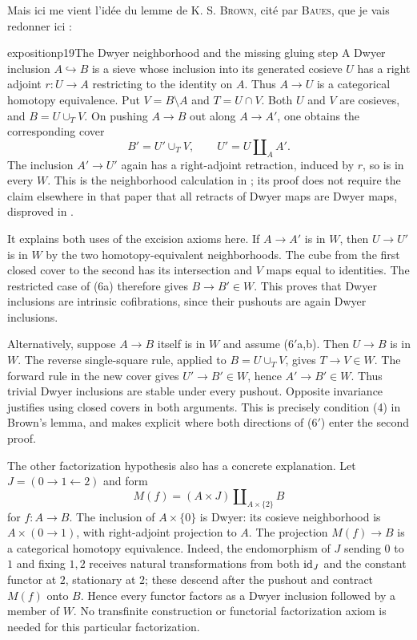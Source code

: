 Mais ici me vient l'idée du lemme de K. S. \textsc{Brown}, cité par \textsc{Baues}, que je vais redonner ici :

\begin{dcomment}{exposition}{p19}{The Dwyer neighborhood and the missing gluing step}
A Dwyer inclusion $A\hookrightarrow B$ is a sieve whose inclusion into its generated cosieve $U$ has a right adjoint $r:U\to A$ restricting to the identity on $A$. Thus $A\to U$ is a categorical homotopy equivalence. Put $V=B\setminus A$ and $T=U\cap V$. Both $U$ and $V$ are cosieves, and $B=U\cup_T V$. On pushing $A\to B$ out along $A\to A'$, one obtains the corresponding cover
\[
B'=U'\cup_T V,\qquad U'=U\amalg_A A'.
\]
The inclusion $A'\to U'$ again has a right-adjoint retraction, induced by $r$, so is in every $W$. This is the neighborhood calculation in \citet[Definition 4.1 and Proposition 4.3, pp.~313--317]{Thomason1980}; its proof does not require the claim elsewhere in that paper that all retracts of Dwyer maps are Dwyer maps, disproved in \citet{Cisinski1999Dwyer}.

It explains both uses of the excision axioms here. If $A\to A'$ is in $W$, then $U\to U'$ is in $W$ by the two homotopy-equivalent neighborhoods. The cube from the first closed cover to the second has its intersection and $V$ maps equal to identities. The restricted case of (6a) therefore gives $B\to B'\in W$. This proves that Dwyer inclusions are intrinsic cofibrations, since their pushouts are again Dwyer inclusions.

Alternatively, suppose $A\to B$ itself is in $W$ and assume (6$'$a,b). Then $U\to B$ is in $W$. The reverse single-square rule, applied to $B=U\cup_T V$, gives $T\to V\in W$. The forward rule in the new cover gives $U'\to B'\in W$, hence $A'\to B'\in W$. Thus trivial Dwyer inclusions are stable under every pushout. Opposite invariance justifies using closed covers in both arguments. This is precisely condition (4) in Brown's lemma, and makes explicit where both directions of (6$'$) enter the second proof.

The other factorization hypothesis also has a concrete explanation. Let $J=(0\to1\leftarrow2)$ and form
\[
M(f)=(A\times J)\amalg_{A\times\{2\}}B
\]
for $f:A\to B$. The inclusion of $A\times\{0\}$ is Dwyer: its cosieve neighborhood is $A\times(0\to1)$, with right-adjoint projection to $A$. The projection $M(f)\to B$ is a categorical homotopy equivalence. Indeed, the endomorphism of $J$ sending $0$ to $1$ and fixing $1,2$ receives natural transformations from both $\mathrm{id}_J$ and the constant functor at $2$, stationary at $2$; these descend after the pushout and contract $M(f)$ onto $B$. Hence every functor factors as a Dwyer inclusion followed by a member of $W$. No transfinite construction or functorial factorization axiom is needed for this particular factorization.
\end{dcomment}


